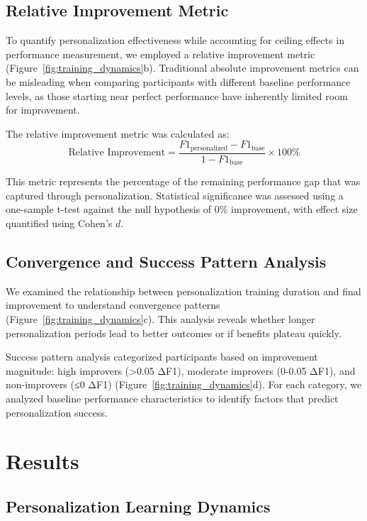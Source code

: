 \documentclass[11pt]{article}
\begin{document}
\subsection{Relative Improvement Metric}

To quantify personalization effectiveness while accounting for ceiling effects in performance measurement, we employed a relative improvement metric (Figure~\ref{fig:training_dynamics}b). Traditional absolute improvement metrics can be misleading when comparing participants with different baseline performance levels, as those starting near perfect performance have inherently limited room for improvement.

The relative improvement metric was calculated as:
\begin{equation}
\text{Relative Improvement} = \frac{F1_{\text{personalized}} - F1_{\text{base}}}{1 - F1_{\text{base}}} \times 100\%
\end{equation}

This metric represents the percentage of the remaining performance gap that was captured through personalization. Statistical significance was assessed using a one-sample t-test against the null hypothesis of 0\% improvement, with effect size quantified using Cohen's $d$.

\subsection{Convergence and Success Pattern Analysis}

We examined the relationship between personalization training duration and final improvement to understand convergence patterns (Figure~\ref{fig:training_dynamics}c). This analysis reveals whether longer personalization periods lead to better outcomes or if benefits plateau quickly.

Success pattern analysis categorized participants based on improvement magnitude: high improvers (>0.05 ΔF1), moderate improvers (0-0.05 ΔF1), and non-improvers (≤0 ΔF1) (Figure~\ref{fig:training_dynamics}d). For each category, we analyzed baseline performance characteristics to identify factors that predict personalization success.

\section{Results}

\subsection{Personalization Learning Dynamics}
\end{document}
